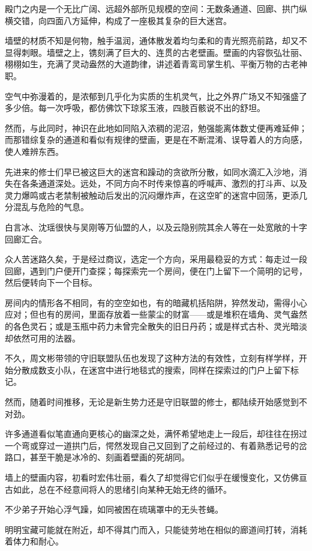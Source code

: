 殿门之内是一个无比广阔、远超外部所见规模的空间：无数条通道、回廊、拱门纵横交错，向四面八方延伸，构成了一座极其复杂的巨大迷宫。

墙壁的材质不知是何物，触手温润，通体散发着均匀柔和的青光照亮前路，却又不显得刺眼。墙壁之上，镌刻满了巨大的、连贯的古老壁画。壁画的内容恢弘壮丽、栩栩如生，充满了灵动盎然的大道韵律，讲述着青鸾司掌生机、平衡万物的古老神职。

空气中弥漫着的，是浓郁到几乎化为实质的生机灵气，比之外界广场又不知强盛了多少倍。每一次呼吸，都仿佛饮下琼浆玉液，四肢百骸说不出的舒坦。

然而，与此同时，神识在此地如同陷入浓稠的泥沼，勉强能离体数丈便再难延伸；而那错综复杂的通道和看似有规律的壁画，更是在不断混淆、误导着人的方向感，使人难辨东西。

先进来的修士们早已被这巨大的迷宫和躁动的贪欲所分散，如同水滴汇入沙地，消失在各条通道深处。远处，不同方向不时传来惊喜的呼喊声、激烈的打斗声、以及灵力爆鸣或古老禁制被触动后发出的沉闷爆炸声，在这空旷的迷宫中回荡，更添几分混乱与危险的气息。

白言冰、沈瑶很快与吴刚等万仙盟的人，以及云隐别院其余人等在一处宽敞的十字回廊汇合。

众人苦迷路久矣，于是经过商议，选定一个方向，采用最稳妥的方式：每走过一段回廊，遇到门户便开门查探；每探索完一个房间，便在门上留下一个简明的记号，然后便转向下一个目标。

房间内的情形各不相同，有的空空如也，有的暗藏机括陷阱，猝然发动，需得小心应对；但也有的房间，里面存放着一些蒙尘的财富——或是堆积在墙角、灵气盎然的各色灵石；或是玉瓶中药力未曾完全散失的旧日丹药；或是样式古朴、灵光暗淡却依然可用的法器。

不久，周文彬带领的守旧联盟队伍也发现了这种方法的有效性，立刻有样学样，开始分散成数支小队，在迷宫中进行地毯式的搜索，同样在探索过的门户上留下标记。

然而，随着时间推移，无论是新生势力还是守旧联盟的修士，都陆续开始感觉到不对劲。

许多通道看似笔直通向更核心的幽深之处，满怀希望地走上一段后，却往往在拐过一个弯或穿过一道拱门后，愕然发现自己又回到了之前经过的、有着熟悉记号的岔路口，甚至干脆是冰冷的、刻画着壁画的死胡同。

墙上的壁画内容，初看时宏伟壮丽，看久了却觉得它们似乎在缓慢变化，又仿佛亘古如此，总在不经意间将人的思绪引向某种无始无终的循环。

不少弟子开始心浮气躁，如同被困在琉璃罩中的无头苍蝇。

明明宝藏可能就在附近，却不得其门而入，只能徒劳地在相似的廊道间打转，消耗着体力和耐心。

